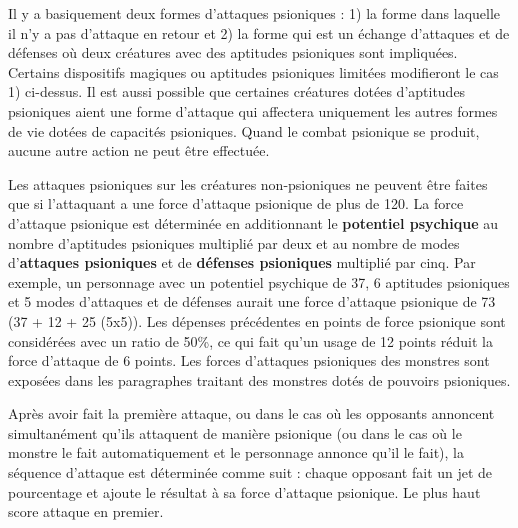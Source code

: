 {Il y a basiquement deux formes d'attaques psioniques : 1) la forme dans laquelle il n'y a pas d'attaque en retour et 2) la forme qui est un échange d'attaques et de défenses où deux créatures avec des aptitudes psioniques sont impliquées. Certains dispositifs magiques ou aptitudes psioniques limitées modifieront le cas 1) ci-dessus. Il est aussi possible que certaines créatures dotées d'aptitudes psioniques aient une forme d'attaque qui affectera uniquement les autres formes de vie dotées de capacités psioniques. Quand le combat psionique se produit, aucune autre action ne peut être effectuée.

\medskip

Les attaques psioniques sur les créatures non-psioniques ne peuvent être faites que si l'attaquant a une force d'attaque psionique de plus de 120. La force d'attaque psionique est déterminée en additionnant le \textbf{potentiel psychique} au nombre d'aptitudes psioniques multiplié par deux et au nombre de modes d'\textbf{attaques psioniques} et de \textbf{défenses psioniques} multiplié par cinq. Par exemple, un personnage avec un potentiel psychique de 37, 6 aptitudes psioniques et 5 modes d'attaques et de défenses aurait une force d'attaque psionique de 73 (37 + 12 + 25 (5x5)). Les dépenses précédentes en points de force psionique sont considérées avec un ratio de 50\%, ce qui fait qu'un usage de 12 points réduit la force d'attaque de 6 points. Les forces d'attaques psioniques des monstres sont exposées dans les paragraphes traitant des monstres dotés de pouvoirs psioniques.

\medskip

Après avoir fait la première attaque, ou dans le cas où les opposants annoncent simultanément qu'ils attaquent de manière psionique (ou dans le cas où le monstre le fait automatiquement et le personnage annonce qu'il le fait), la séquence d'attaque est déterminée comme suit : chaque opposant fait un jet de pourcentage et ajoute le résultat à sa force d'attaque psionique. Le plus haut score attaque en premier.

\bigskip

}
